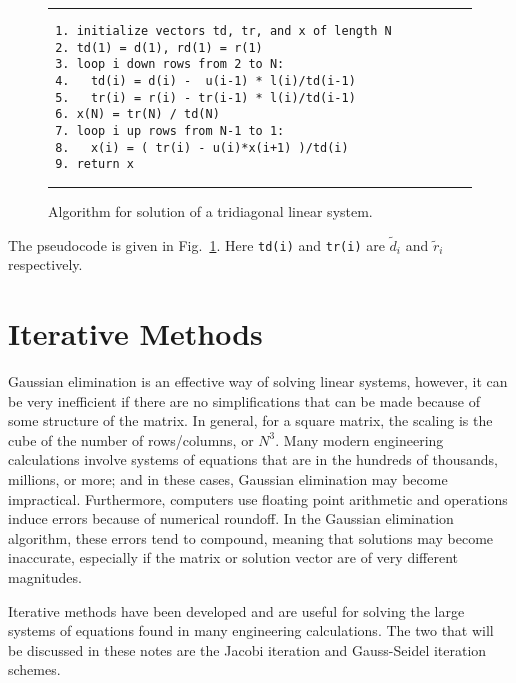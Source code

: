 \begin{figure}[htb!]
\begin{center}
\noindent \rule{\textwidth}{1pt}
\begin{verbatim}
 1. initialize vectors td, tr, and x of length N
 2. td(1) = d(1), rd(1) = r(1)
 3. loop i down rows from 2 to N:
 4.   td(i) = d(i) -  u(i-1) * l(i)/td(i-1)
 5.   tr(i) = r(i) - tr(i-1) * l(i)/td(i-1)
 6. x(N) = tr(N) / td(N)
 7. loop i up rows from N-1 to 1:
 8.   x(i) = ( tr(i) - u(i)*x(i+1) )/td(i)
 9. return x
\end{verbatim}
\rule{\textwidth}{1pt}
\caption{Algorithm for solution of a tridiagonal linear system.}
\label{Fig:linearAlgebra_tridiagonalSolveAlgorithm}
\end{center}
\end{figure}

The pseudocode is given in Fig.~\ref{Fig:linearAlgebra_tridiagonalSolveAlgorithm}. Here \texttt{td(i)} and \texttt{tr(i)} are $\widetilde{d}_i$ and $\widetilde{r}_i$ respectively.

\section{Iterative Methods}

Gaussian elimination is an effective way of solving linear systems, however, it can be very inefficient if there are no simplifications that can be made because of some structure of the matrix. In general, for a square matrix, the scaling is the cube of the number of rows/columns, or $N^3$. Many modern engineering calculations involve systems of equations that are in the hundreds of thousands, millions, or more; and in these cases, Gaussian elimination may become impractical. Furthermore, computers use floating point arithmetic and operations induce errors because of numerical roundoff. In the Gaussian elimination algorithm, these errors tend to compound, meaning that solutions may become inaccurate, especially if the matrix or solution vector are of very different magnitudes.

Iterative methods have been developed and are useful for solving the large systems of equations found in many engineering calculations. The two that will be discussed in these notes are the Jacobi iteration and Gauss-Seidel iteration schemes.

